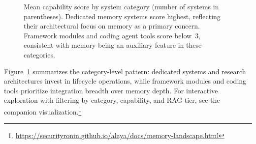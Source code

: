 \begin{figure}[!t]
\centering
{}
\caption{Mean capability score by system category (number of systems in
parentheses).  Dedicated memory systems score highest, reflecting their
architectural focus on memory as a primary concern.  Framework modules and
coding agent tools score below~3, consistent with memory being an auxiliary
feature in these categories.}
\label{fig:category-scores}
\end{figure}

Figure~\ref{fig:category-scores} summarizes the category-level pattern:
dedicated systems and research architectures invest in lifecycle operations,
while framework modules and coding tools prioritize integration breadth over
memory depth.  For interactive exploration with filtering by category,
capability, and RAG tier, see the companion
visualization.\footnote{\url{https://securityronin.github.io/alaya/docs/memory-landscape.html}}
